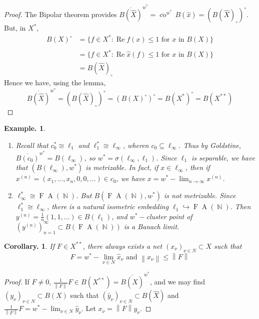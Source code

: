 \documentclass[11pt, a4paper]{memoir}
\DeclareMathOperator{\N}{{\mathbb{N}}}
\newcommand{\norm}[1]{\ensuremath{\left\lVert#1\right\rVert}}
\theoremstyle{change}
\newtheorem{corollary}[theorem]{Corollary.}
\theoremstyle{plain}
\theoremstyle{nonumberplain}
\newtheorem{example}{Example.}
\newtheorem{proof}{Proof}
\renewcommand{\Re}{\ensuremath{\operatorname{Re}}}
\newcommand{\cwx}{\ensuremath{\overline{\operatorname{co}}^{w^*}\,}}
\newcommand{\FA}{\ensuremath{\operatorname{F}\!\operatorname{A}}}
\numberwithin{equation}{section}
\begin{document}
\begin{proof}
    The Bipolar theorem provides $\overline{B(\hat X)}^{w^*}=\cwx B(\hat x)=(B(\hat X)_\circ)^\circ$.
    But, in $X^*$,
    \begin{align*}
        B(X)^\circ &= \{f\in X^*:\Re f(x)\leq 1\text{ for $x$ in }B(X)\}\\
                   &= \{f\in \hat{X^*}:\Re \hat x(f)\leq 1\text{ for $x$ in }B(X)\}\\
                   &= B(\hat X)_\circ
    \end{align*}
    Hence we have, using the lemma,
    \begin{equation*}
        \overline{B(\hat X)}^{w^*}=(B(\hat X)_\circ)^\circ=(B(X)^\circ)^\circ=B(X^*)^\circ=B(X^{**})
    \end{equation*}
\end{proof}
\begin{example}
    \begin{enumerate}[nl,r]
        \item Recall that $c_0^*\cong\ell_1$ and $\ell_1^*\cong\ell_\infty$, wheren $c_0\subseteq\ell_\infty$.
            Thus by Goldstine, $\overline{B(c_0)}^{w^*}=B(\ell_\infty)$, so $w^*=\sigma(\ell_\infty,\ell_1)$.
            Since $\ell_1$ is separable, we have that $(B(\ell_\infty),w^*)$ is metrizable.
            In fact, if $x\in\ell_\infty$, then if $x^{(n)}=(x_1,\ldots,x_n,0,0,\ldots)\in c_0$, we have $x=w^*-\lim_{n\to\infty}x^{(n)}$.
        \item $\ell_\infty^*\cong\FA(\N)$.
            But $B(\FA(\N),w^*)$ is not metrizable.
            Since $\ell_1^*\cong\ell_\infty$, there is a natural isometric embedding $\ell_1\hookrightarrow\FA(\N)$.
            Then $y^{(n)}=\frac{1}{n}(1,1,\ldots)\in B(\ell_1)$, and $w^*-$cluster point of $(y^{(n)})_{n=1}^\infty\subset B(\FA(\N))$ is a Banach limit.
    \end{enumerate}
\end{example}
\begin{corollary}
    If $F\in X^{**}$, there always exists a net $(x_\nu)_{\nu\in N}\subset X$ such that
    \begin{equation*}
        F=w^*-\lim_{\nu\in N}\hat x_\nu\text{ and }\norm{x_\nu}\leq\norm{F}
    \end{equation*}
\end{corollary}
\begin{proof}
    If $F\neq 0$, $\frac{1}{\norm{F}}F\in B(X^{**})=\overline{B(\hat X)}^{w^*}$, and we may find $(y_\nu)_{\nu\in N}\subset B(X)$ such that $(\hat y_\nu)_{\nu\in N}\subset B(\hat X)$ and $\frac{1}{\norm{F}}F=w^*-\lim_{\nu\in N}\hat y_\nu$.
    Let $x_\nu=\norm{F}y_\nu$.
\end{proof}
\end{document}
